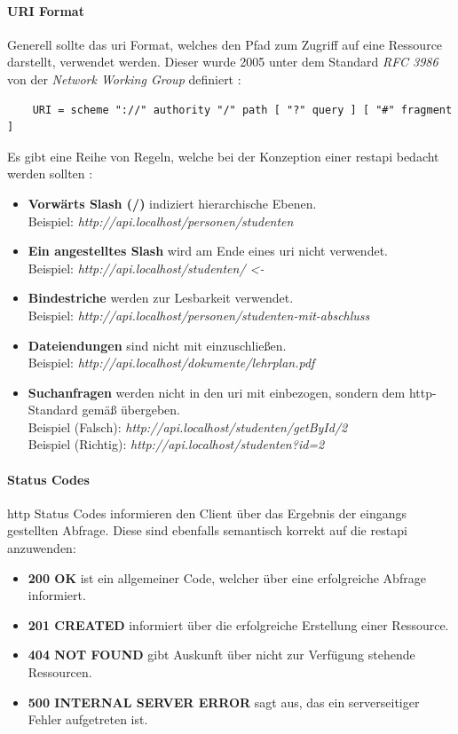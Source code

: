 \paragraph{URI Format}
Generell sollte das \gls{uri} Format, welches den Pfad zum Zugriff auf eine Ressource darstellt, verwendet werden. Dieser wurde 2005 unter dem Standard \textit{RFC 3986} von der \textit{Network Working Group} definiert \cite{nwg.2005}:
\begin{verbatim}
    URI = scheme "://" authority "/" path [ "?" query ] [ "#" fragment ]
\end{verbatim}
Es gibt eine Reihe von Regeln, welche bei der Konzeption einer \gls{restapi} bedacht werden sollten \cite{Masse.2012}:
\begin{itemize}
    \item \textbf{Vorwärts Slash (/)} indiziert hierarchische Ebenen. \\
    Beispiel: \textit{http://api.localhost/personen/studenten}
    \item \textbf{Ein angestelltes Slash} wird am Ende eines \gls{uri} nicht verwendet. \\ 
    Beispiel: \textit{http://api.localhost/studenten/ <-}
    \item \textbf{Bindestriche} werden zur Lesbarkeit verwendet.\\
    Beispiel: \textit{http://api.localhost/personen/studenten-mit-abschluss}
    \item \textbf{Dateiendungen} sind nicht mit einzuschließen. \\
    Beispiel: \textit{http://api.localhost/dokumente/lehrplan.pdf}
    \item \textbf{Suchanfragen} werden nicht in den \gls{uri} mit einbezogen, sondern dem \gls{http}-Standard gemäß übergeben.\\
    Beispiel (Falsch): \textit{http://api.localhost/studenten/getById/2} \\
    Beispiel (Richtig): \textit{http://api.localhost/studenten?id=2}
\end{itemize}

\paragraph{Status Codes} \gls{http} Status Codes informieren den Client über das Ergebnis der eingangs gestellten Abfrage. \cite{nwg.1999} Diese sind ebenfalls semantisch korrekt auf die \gls{restapi} anzuwenden:

\begin{itemize}
    \item \textbf{200 OK} ist ein allgemeiner Code, welcher über eine erfolgreiche Abfrage informiert.
    \item \textbf{201 CREATED} informiert über die erfolgreiche Erstellung einer Ressource.
    \item \textbf{404 NOT FOUND} gibt Auskunft über nicht zur Verfügung stehende Ressourcen.
    \item \textbf{500 INTERNAL SERVER ERROR} sagt aus, das ein serverseitiger Fehler aufgetreten ist.
\end{itemize}


